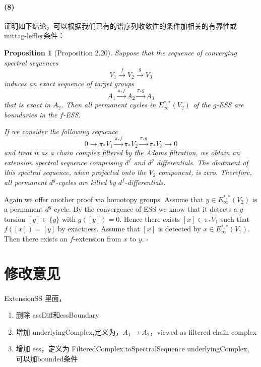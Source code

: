 \documentclass[12pt,a4paper]{article}
\renewenvironment{proof}{{\noindent\it\textbf{Proof}}\quad\it}{\hfill$\square$}
\newtheorem{prop}[equation]{Proposition}
\begin{document}
\begin{sloppy}
\paragraph{(8)}证明如下结论，可以根据我们已有的谱序列收敛性的条件加相关的有界性或mittag-leffler条件：

\begin{prop}[Proposition 2.20]
Suppose that the sequence of converging spectral sequences
$$V_1 \xrightarrow{f} V_2 \xrightarrow{g} V_3$$
induces an exact sequence of target groups
$$A_1 \xrightarrow{\pi_*f} A_2 \xrightarrow{\pi_*g} A_3$$
that is exact in $A_2$. Then all permanent cycles in $E_\infty^{*,*}(V_2)$ of the $g$-ESS are boundaries in the $f$-ESS.
\end{prop}
\begin{proof}
If we consider the following sequence
$$0 \to \pi_*V_1 \xrightarrow{\pi_*f} \pi_*V_2 \xrightarrow{\pi_*g} \pi_*V_3 \to 0$$
and treat it as a chain complex filtered by the Adams filtration, we obtain an extension spectral sequence comprising $d^f$ and $d^g$ differentials. The abutment of this spectral sequence, when projected onto the $V_2$ component, is zero. Therefore, all permanent $d^g$-cycles are killed by $d^f$-differentials.

Again we offer another proof via homotopy groups. Assume that $y \in E_\infty^{*,*}(V_2)$ is a permanent $d^g$-cycle. By the convergence of ESS we know that it detects a $g$-torsion $[y] \in \{y\}$ with $g([y]) = 0$. Hence there exists $[x] \in \pi_*V_1$ such that $f([x]) = [y]$ by exactness. Assume that $[x]$ is detected by $x \in E_\infty^{*,*}(V_1)$. Then there exists an $f$-extension from $x$ to $y$.
\end{proof}

\section{修改意见}

\paragraph{} ExtensionSS 里面，\begin{enumerate}
    \item 删除 assDiff和essBoundary
    \item 增加 underlyingComplex,定义为，$A_1\rightarrow A_2$，viewed as filtered chain complex 
    \item 增加 ess，定义为 FilteredComplex.toSpectralSequence underlyingComplex, 可以加bounded条件
\end{enumerate}


\end{sloppy}
\end{document}
